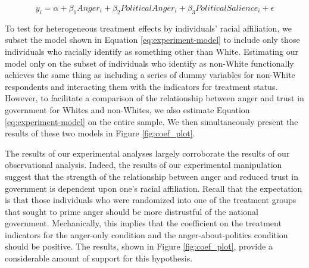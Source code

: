 \documentclass[12t, letterpaper]{article}
\begin{document}
\vspace{-13mm}
\begin{center}
\begin{equation}
y_i = \alpha + \beta_1 Anger_i + \beta_2 PoliticalAnger_i + \beta_3 PoliticalSalience_i + \epsilon
\label{eq:experiment-model}
\end{equation}
\end{center}

To test for heterogeneous treatment effects by individuals' racial affiliation, we subset the model shown in Equation \ref{eq:experiment-model} to include only those individuals who racially identify as something other than White. Estimating our model only on the subset of individuals who identify as non-White functionally achieves the same thing as including a series of dummy variables for non-White respondents and interacting them with the indicators for treatment status. However, to facilitate a comparison of the relationship between anger and trust in government for Whites and non-Whites, we also estimate Equation \ref{eq:experiment-model} on the entire sample. We then simultaneously present the results of these two models in Figure \ref{fig:coef_plot}.

The results of our experimental analyses largely corroborate the results of our observational analysis. Indeed, the results of our experimental manipulation suggest that the strength of the relationship between anger and reduced trust in government is dependent upon one's racial affiliation. Recall that the expectation is that those individuals who were randomized into one of the treatment groups that sought to prime anger should be more distrustful of the national government. Mechanically, this implies that the coefficient on the treatment indicators for the anger-only condition and the anger-about-politics condition should be positive. The results, shown in Figure \ref{fig:coef_plot}, provide a considerable amount of support for this hypothesis.
\end{document}

